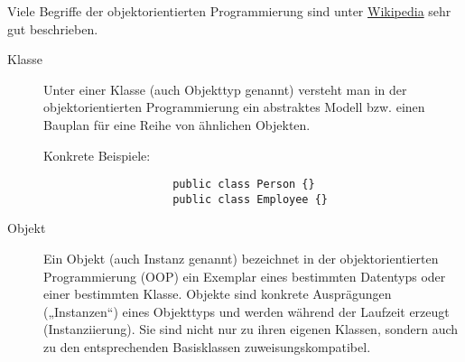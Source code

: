 \documentclass[12pt,a4paper]{exam}
\begin{document}
\begin{questions}

        \addpoints

        \ifprintanswers
        \begin{solution}
            Viele Begriffe der objektorientierten Programmierung sind unter
            \href{https://de.wikipedia.org/wiki/Kategorie:Objektorientierte_Programmierung}
            {Wikipedia} sehr gut beschrieben.
            \begin{description}
                \item[Klasse]
                Unter einer Klasse (auch Objekttyp genannt) versteht man
                in der objektorientierten Programmierung ein abstraktes
                Modell bzw. einen Bauplan für eine Reihe von ähnlichen
                Objekten.

                Konkrete Beispiele:
                \begin{verbatim}
                    public class Person {}
                    public class Employee {}
                \end{verbatim}

                \item[Objekt] Ein Objekt (auch Instanz genannt) bezeichnet in
                der objektorientierten Programmierung (OOP) ein Exemplar
                eines bestimmten Datentyps oder einer bestimmten Klasse.
                Objekte sind konkrete Ausprägungen („Instanzen“) eines
                Objekttyps und werden während der Laufzeit erzeugt
                (Instanziierung). Sie sind nicht nur zu ihren eigenen
                Klassen, sondern auch zu den entsprechenden Basisklassen
                zuweisungskompatibel.


\end{description}
\end{solution}
\end{questions}
\end{document}
